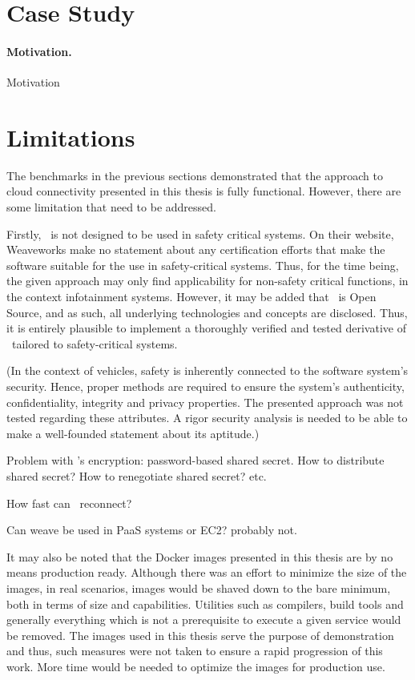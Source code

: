 %
%
%
%
%
%
%
%
%
%

\section{Case Study}

\paragraph{Motivation.} Motivation

%
%
%
%
%
%
%
%
%
%


\section{Limitations}

The benchmarks in the previous sections demonstrated that the approach to cloud connectivity presented in this thesis is fully functional. However, there are some limitation that need to be addressed.

Firstly, \wnet\ is not designed to be used in safety critical systems. On their website, Weaveworks make no statement about any certification efforts that make the software suitable for the use in safety-critical systems. Thus, for the time being, the given approach may only find applicability for non-safety critical functions, \eg in the context infotainment systems. However, it may be added that \wnet\ is Open Source, and as such, all underlying technologies and concepts are disclosed. Thus, it is entirely plausible to implement a thoroughly verified and tested derivative of \wnet\ tailored to safety-critical systems.

(In the context of vehicles, safety is inherently connected to the software system's security. Hence, proper methods are required to ensure the system's authenticity, confidentiality, integrity and privacy properties. The presented approach was not tested regarding these attributes. A rigor security analysis is needed to be able to make a well-founded statement about its aptitude.)

Problem with \wnet 's encryption: password-based shared secret. How to distribute shared secret? How to renegotiate shared secret? etc.


How fast can \wnet\ reconnect?

Can weave be used in PaaS systems or EC2? probably not.

It may also be noted that the Docker images presented in this thesis are by no means production ready. Although there was an effort to minimize the size of the images, in real scenarios, images would be shaved down to the bare minimum, both in terms of size and capabilities. Utilities such as compilers, build tools and generally everything which is not a prerequisite to execute a given service would be removed. The images used in this thesis serve the purpose of demonstration and thus, such measures were not taken to ensure a rapid progression of this work. More time would be needed to optimize the images for production use.


%
%
%
%
%
%
%
%
%
%
%
%
%
%
%
%
%
%
%
%
%
%
%
%
%
%
%
%
%
%
%
%